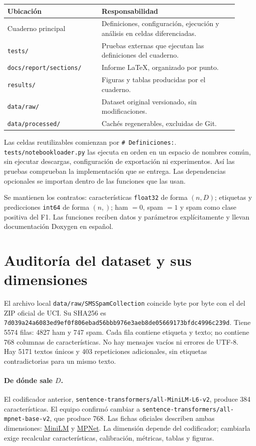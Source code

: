\documentclass[11pt,letterpaper]{article}
\renewcommand{\_}{\originalunderscore\allowbreak}
\begin{document}
\begin{center}
\begin{tabular}{p{0.38\linewidth}p{0.55\linewidth}}
\toprule
\textbf{Ubicación} & \textbf{Responsabilidad}\\
\midrule
Cuaderno principal & Definiciones, configuración, ejecución y análisis en
celdas diferenciadas.\\
\texttt{tests/} & Pruebas externas que ejecutan las definiciones del cuaderno.\\
\texttt{docs/report/sections/} & Informe LaTeX, organizado por punto.\\
\texttt{results/} & Figuras y tablas producidas por el cuaderno.\\
\texttt{data/raw/} & Dataset original versionado, sin modificaciones.\\
\texttt{data/processed/} & Cachés regenerables, excluidas de Git.\\
\bottomrule
\end{tabular}
\end{center}

Las celdas reutilizables comienzan por \texttt{\# Definiciones:}.
\texttt{tests/notebook\_loader.py} las ejecuta en orden en un espacio de
nombres común, sin ejecutar descargas, configuración de exportación ni
experimentos. Así las pruebas comprueban la implementación que se entrega.
Las dependencias opcionales se importan dentro de las funciones que las usan.

Se mantienen los contratos: características \texttt{float32} de forma
$(n,D)$; etiquetas y predicciones \texttt{int64} de forma $(n,)$; ham $=0$,
spam $=1$ y spam como clase positiva del F1. Las funciones reciben datos y
parámetros explícitamente y llevan documentación Doxygen en español.

\section{Auditoría del dataset y sus dimensiones}
El archivo local \texttt{data/raw/SMSSpamCollection} coincide byte por byte
con el del ZIP oficial de UCI. Su SHA256 es
\texttt{7d039a24a6083ed9ef0f806ebad56bbb9\allowbreak 76e3aeb8de05669173bfdc4996c239d}.
Tiene 5574 filas: 4827 ham y 747 spam. Cada fila contiene etiqueta y texto;
no contiene 768 columnas de características. No hay mensajes vacíos ni errores
de UTF-8. Hay 5171 textos únicos y 403 repeticiones adicionales, sin etiquetas
contradictorias para un mismo texto.

\paragraph{De dónde sale $D$.} El codificador anterior,
\texttt{sentence-transformers/all-MiniLM-L6-v2}, produce 384 características.
El equipo confirmó cambiar a
\texttt{sentence-transformers/all-mpnet-base-v2}, que produce 768. Las fichas
oficiales describen ambas dimensiones:
\href{https://huggingface.co/sentence-transformers/all-MiniLM-L6-v2}{MiniLM}
y \href{https://huggingface.co/sentence-transformers/all-mpnet-base-v2}{MPNet}.
La dimensión depende del codificador; cambiarla exige recalcular
características, calibración, métricas, tablas y figuras.
\end{document}
